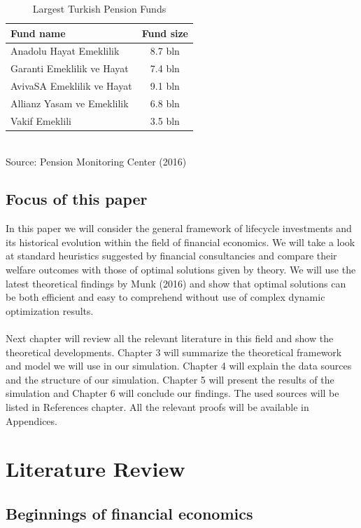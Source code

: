 \documentclass[]{article}
\begin{document}
\begin{table}
	\centering
	\caption{Largest Turkish Pension Funds}
	\begin{tabular}[H]{lc}
		\hline
		Fund name&Fund size\\
		\hline
		Anadolu Hayat Emeklilik&8.7 bln\\
		Garanti Emeklilik ve Hayat&7.4 bln\\
		AvivaSA Emeklilik ve Hayat&9.1 bln\\
		Allianz Yasam ve Emeklilik&6.8 bln\\
		Vakif Emeklili&3.5 bln\\
		\hline
	\end{tabular}\\
	Source: Pension Monitoring Center (2016)
\end{table}

\subsection{Focus of this paper}
In this paper we will consider the general framework of lifecycle investments and its historical evolution within the field of financial economics. We will take a look at standard heuristics suggested by financial consultancies and compare their welfare outcomes with those of optimal solutions given by theory. We will use the latest theoretical findings by Munk (2016) and show that optimal solutions can be both efficient and easy to comprehend without use of complex dynamic optimization results.
\paragraph*{}Next chapter will review all the relevant literature in this field and show the theoretical developments. Chapter 3 will summarize the theoretical framework and model we will use in our simulation. Chapter 4 will explain the data sources and the structure of our simulation. Chapter 5 will present the results of the simulation and Chapter 6 will conclude our findings. The used sources will be listed in References chapter. All the relevant proofs will be available in Appendices. 




\section{Literature Review}
\label{litreview}

\subsection{Beginnings of financial economics}
\end{document}
